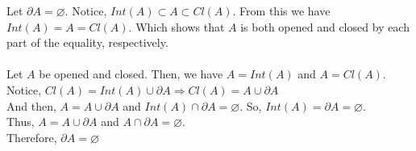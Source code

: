 \documentclass[12pt]{article}
\begin{document}
\begin{enumerate}
\begin{enumerate}
			Let $ \partial A = \varnothing $. Notice, $ Int(A) \subset A \subset Cl(A) $. From this we have $ Int(A) = A = Cl(A) $. Which shows that $ A $ is both opened and closed by each part of the equality, respectively.\\
			\\
			Let $ A $ be opened and closed. Then, we have $ A = Int(A) $ and $ A = Cl(A) $. Notice, $ Cl(A) = Int(A) \cup \partial A \Rightarrow Cl(A) = A \cup \partial A $\\
			And then, $ A = A \cup \partial A  $ and $ Int(A) \cap \partial A = \varnothing $. So, $ Int(A) = \partial A = \varnothing. $ \\
			Thus, $ A = A \cup \partial A $ and $ A \cap \partial A = \varnothing$.\\
			Therefore, $ \partial A = \varnothing $
		\end{enumerate}
\end{enumerate}
 
\end{document}
